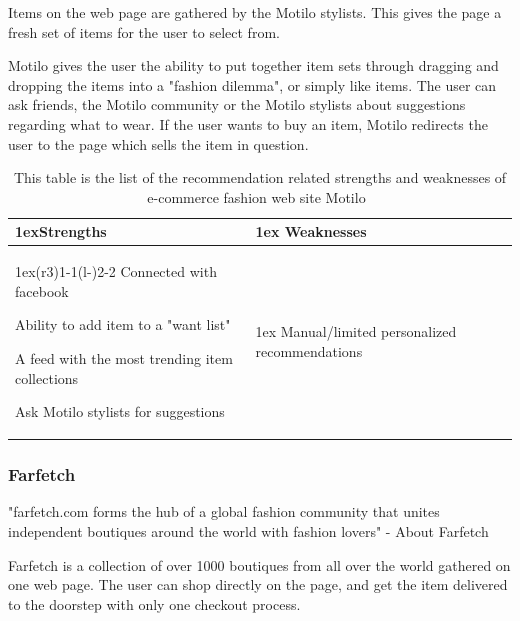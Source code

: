     Items on the web page are gathered by the Motilo stylists.
    This gives the page a fresh set of items for the user to select from.

    Motilo gives the user the ability to put together item sets through dragging and dropping the items into a "fashion dilemma", or simply like items.
    The user can ask friends, the Motilo community or the Motilo stylists about suggestions regarding what to wear.
    If the user wants to buy an item, Motilo redirects the user to the page which sells the item in question.
    
    \begin{table}[H]
    \centering
    \begin{tabularx}{\linewidth}{>{\parskip1ex}X@{\kern4\tabcolsep}>{\parskip1ex}X}
    	\toprule
    	\hfil\bfseries Strengths
    	&
    	\hfil\bfseries Weaknesses
    		\\\cmidrule(r{3\tabcolsep}){1-1}\cmidrule(l{-\tabcolsep}){2-2}
            Connected with facebook \par
            Ability to add item to a "want list" \par
            A feed with the most trending item collections \par
            Ask Motilo stylists for suggestions \par
            &
            Manual/limited personalized recommendations \par
            \\\bottomrule
            \end{tabularx}
            \caption[Recommendation related strengths and weaknesses of Motilo~\cite{motilo}]{This table is the list of the recommendation related strengths and weaknesses of e-commerce fashion web site Motilo~\cite{motilo}}
            \label{table:ecommenreceMotilo}
        \end{table}
    
    


\subsubsection{Farfetch} %
\label{par:farfetch}
    "farfetch.com forms the hub of a global fashion community that unites independent boutiques around the world with fashion lovers" - About Farfetch~\cite{Farfetch}

    Farfetch is a collection of over 1000 boutiques from all over the world gathered on one web page.
    The user can shop directly on the page, and get the item delivered to the doorstep with only one checkout process.

